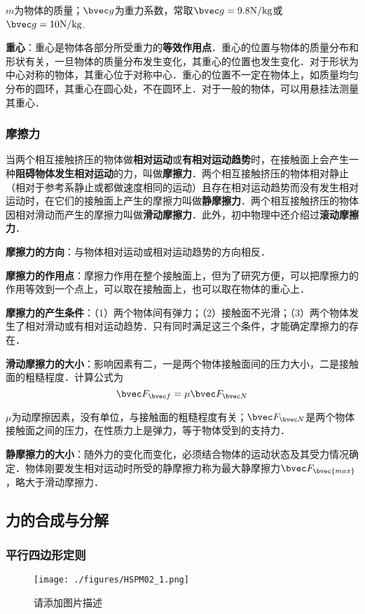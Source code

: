 $m$为物体的质量；$\bvec g$为重力系数，常取$\bvec g=9.8\mathrm{N/kg}$或$\bvec g=\mathrm{10N/kg}$.

\textbf{重心}：重心是物体各部分所受重力的\textbf{等效作用点}．重心的位置与物体的质量分布和形状有关，一旦物体的质量分布发生变化，其重心的位置也发生变化．对于形状为中心对称的物体，其重心位于对称中心．重心的位置不一定在物体上，如质量均匀分布的圆环，其重心在圆心处，不在圆环上．对于一般的物体，可以用悬挂法测量其重心．


\subsubsection{摩擦力}
当两个相互接触挤压的物体做\textbf{相对运动}或\textbf{有相对运动趋势}时，在接触面上会产生一种\textbf{阻碍物体发生相对运动}的力，叫做\textbf{摩擦力}．两个相互接触挤压的物体相对静止（相对于参考系静止或都做速度相同的运动）且存在相对运动趋势而没有发生相对运动时，在它们的接触面上产生的摩擦力叫做\textbf{静摩擦力}．两个相互接触挤压的物体因相对滑动而产生的摩擦力叫做\textbf{滑动摩擦力}．此外，初中物理中还介绍过\textbf{滚动摩擦力}．

\textbf{摩擦力的方向}：与物体相对运动或相对运动趋势的方向相反．

\textbf{摩擦力的作用点}：摩擦力作用在整个接触面上，但为了研究方便，可以把摩擦力的作用等效到一个点上，可以取在接触面上，也可以取在物体的重心上．

\textbf{摩擦力的产生条件}：（1）两个物体间有弹力；（2）接触面不光滑；（3）两个物体发生了相对滑动或有相对运动趋势．只有同时满足这三个条件，才能确定摩擦力的存在．

\textbf{滑动摩擦力的大小}：影响因素有二，一是两个物体接触面间的压力大小，二是接触面的粗糙程度．计算公式为
\begin{equation}
\bvec F_{\bvec f}=\mu \bvec F_{\bvec N}
\end{equation}

$\mu$为动摩擦因素，没有单位，与接触面的粗糙程度有关；$\bvec F_{\bvec N}$是两个物体接触面之间的压力，在性质力上是弹力，等于物体受到的支持力．

\textbf{静摩擦力的大小}：随外力的变化而变化，必须结合物体的运动状态及其受力情况确定．物体刚要发生相对运动时所受的静摩擦力称为最大静摩擦力$\bvec F_\bvec{max}$，略大于滑动摩擦力．

\subsection{力的合成与分解}
\subsubsection{平行四边形定则}
\begin{figure}[ht]
\centering
\texttt{[image: ./figures/HSPM02\_1.png]}
\caption{请添加图片描述} \label{HSPM02_fig1}
\end{figure}
